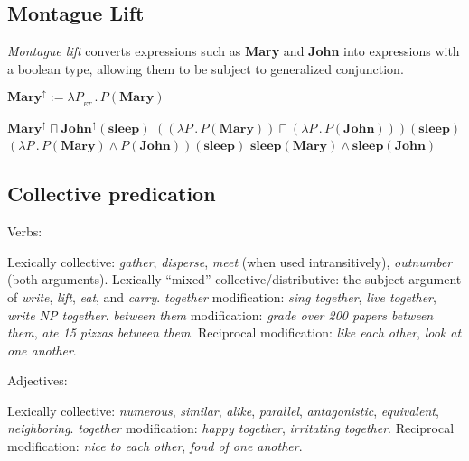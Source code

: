 \documentclass[letterpaper,parskip=half]{scrartcl}
\begin{document}
\subsection{Montague Lift}
\label{sec:orgdaaa2ea}

\emph{Montague lift} converts expressions such as \textbf{Mary} and \textbf{John} into expressions with a boolean type, allowing them to be subject to generalized conjunction.

\begin{exe}
\ex \(\mathbf{Mary}^\uparrow := \lambda P_{_{ET}}\,.\,P(\mathbf{Mary})\)
\label{orgf4c2814}
\end{exe}

\begin{exe}
\ex \(\mathbf{Mary}^\uparrow \sqcap \mathbf{John}^\uparrow(\mathbf{sleep})\)
\ex \(((\lambda P\,.\,P(\mathbf{Mary})) \sqcap (\lambda P\,.\,P(\mathbf{John})))(\mathbf{sleep})\)
\ex \((\lambda P\,.\,P(\mathbf{Mary}) \wedge P(\mathbf{John}))(\mathbf{sleep})\)
\ex \(\mathbf{sleep}(\mathbf{Mary}) \wedge \mathbf{sleep}(\mathbf{John})\)
\label{orge9548a2}
\end{exe}

\subsection{Collective predication}
\label{sec:orge1d507b}

Verbs:

\begin{exe}
\ex Lexically collective: \emph{gather}, \emph{disperse}, \emph{meet} (when used intransitively), \emph{outnumber} (both arguments).
\ex Lexically ``mixed'' collective/distributive: the subject argument of \emph{write}, \emph{lift}, \emph{eat}, and \emph{carry}.
\ex \emph{together} modification: \emph{sing together}, \emph{live together}, \emph{write NP together}.
\ex \emph{between them} modification: \emph{grade over 200 papers between them}, \emph{ate 15 pizzas between them}.
\ex Reciprocal modification: \emph{like each other}, \emph{look at one another}.
\label{orgc8683a2}
\end{exe}

Adjectives:

\begin{exe}
\ex Lexically collective: \emph{numerous}, \emph{similar}, \emph{alike}, \emph{parallel}, \emph{antagonistic}, \emph{equivalent}, \emph{neighboring}.
\ex \emph{together} modification: \emph{happy together}, \emph{irritating together}.
\ex Reciprocal modification: \emph{nice to each other}, \emph{fond of one another}.
\label{orgd4ea27a}
\end{exe}
\end{document}
